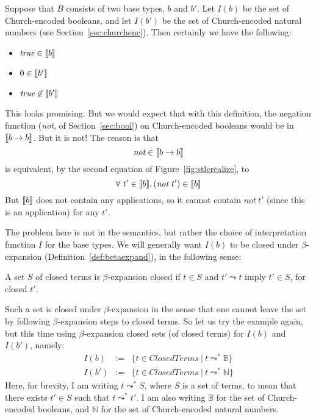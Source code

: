 Suppose that $B$ consists of two base types, $b$ and $b'$.  Let $I(b)$ be the set of Church-encoded booleans,
and let $I(b')$ be the set of Church-encoded natural numbers (see Section~\ref{sec:churchenc}).  Then
certainly we have the following:
\begin{itemize}
\item $\textit{true}\in\llbracket b \rrbracket$
\item $0\in\llbracket b' \rrbracket$
\item $\textit{true}\not\in\llbracket b' \rrbracket$
\end{itemize}

\noindent This looks promising.  But we would expect that with this definition, the negation
function (\textit{not}, of Section~\ref{sec:bool}) on Church-encoded booleans
would be in $\llbracket b\to b \rrbracket$.  But it is not!  The reason is that
\[
\textit{not}\in\llbracket b \to b \rrbracket
\]
\noindent is equivalent, by the second equation of Figure~\ref{fig:stlcrealize}, to
\[
\all{t'\in\interp{b}}{(\textit{not}\ t')\in\interp{b}}
\]
\noindent But $\llbracket b \rrbracket$ does not contain any applications, so it
cannot contain $\textit{not}\ t'$ (since this is an application) for
any $t'$.

The problem here is not in the semantics, but rather the choice of
interpretation function $I$ for the base types.  We will generally
want $I(b)$ to be closed under $\beta$-expansion (Definition~\ref{def:betaexpand}), in the following sense:

\begin{definition}
  A set $S$ of closed terms is $\beta$-expansion closed if $t\in S$ and $t' \leadsto t$ imply $t' \in S$, for closed $t'$. 
\end{definition}

Such a set is closed under $\beta$-expansion in the sense that one cannot leave the
set by following $\beta$-expansion steps to closed terms.  So let us try the example again,
but this time using $\beta$-expansion closed sets (of closed terms) for $I(b)$ and $I(b')$,
namely:
\[
\begin{array}{lll}
  I(b) & := & \{ t\in\textit{ClosedTerms}\ |\ t \leadsto^* \mathbb{B}\} \\
  I(b') & := & \{ t\in\textit{ClosedTerms}\ |\ t \leadsto^* \mathbb{N}\} 
\end{array}
\]
\noindent Here, for brevity, I am writing $t \leadsto^* S$, where $S$
is a set of terms, to mean that there exists $t'\in S$ such that
$t\leadsto^* t'$.  I am also writing $\mathbb{B}$ for the set of
Church-encoded booleans, and $\mathbb{N}$ for the set of
Church-encoded natural numbers.

